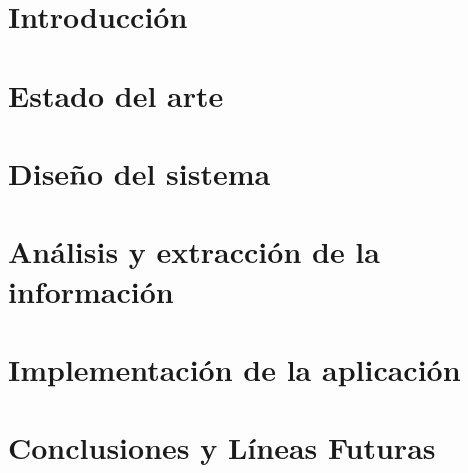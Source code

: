 \documentclass[12pt, a4paper, twoside]{article}
\begin{document}


\clearpage
\setcounter{page}{1}



\newpage



\newpage



\tableofcontents

\section{Introducción}


\newpage

\section{Estado del arte}

\newpage

\section{Diseño del sistema}

\newpage

\section{Análisis y extracción de la información}

\newpage

\section{Implementación de la aplicación}

\newpage


\section{Conclusiones y Líneas Futuras}


\newpage

%

\end{document}
